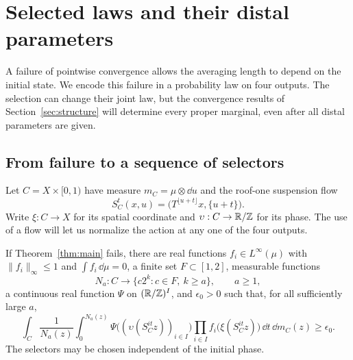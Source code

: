 \section{Selected laws and their distal parameters}
\label{sec:selected}

A failure of pointwise convergence allows the averaging length to
depend on the initial state.  We encode this failure in a probability
law on four outputs.  The selection can change their joint law, but
the convergence results of Section~\ref{sec:structure} will determine
every proper marginal, even after all distal parameters are given.

\subsection{From failure to a sequence of selectors}

Let $C=X\times[0,1)$ have measure $m_C=\mu\otimes\dd u$ and the
roof-one suspension flow
\begin{equation}\label{eq:suspension}
 S_C^t(x,u)=\bigl(T^{\lfloor u+t\rfloor}x,\{u+t\}\bigr).
\end{equation}
Write $\xi:C\to X$ for its spatial coordinate and
$\upsilon:C\to\mathbb R/\mathbb Z$ for its phase.  The use of a flow will let
us normalize the action at any one of the four outputs.

\begin{proposition}\label{prop:selectors}
If Theorem~\ref{thm:main} fails, there are real functions
$f_i\in L^\infty(\mu)$ with $\|f_i\|_\infty\le1$ and
$\int f_i\,\dd\mu=0$, a finite set $F\subset[1,2]$, measurable
functions
\[
 N_a:C\longrightarrow\{c2^k:c\in F,\ k\ge a\},\qquad a\ge1,
\]
a continuous real function $\Psi$ on $(\mathbb R/\mathbb Z)^I$, and
$\epsilon_0>0$ such that, for all sufficiently large $a$,
\begin{equation}\label{eq:selected-positive}
 \int_C\frac1{N_a(z)}\int_0^{N_a(z)}
 \Psi\bigl((\upsilon(S_C^{it}z))_{i\in I}\bigr)
 \prod_{i\in I}f_i\bigl(\xi(S_C^{it}z)\bigr)
 \,\dd t\,\dd m_C(z)\ge\epsilon_0.
\end{equation}
The selectors may be chosen independent of the initial phase.
\end{proposition}

